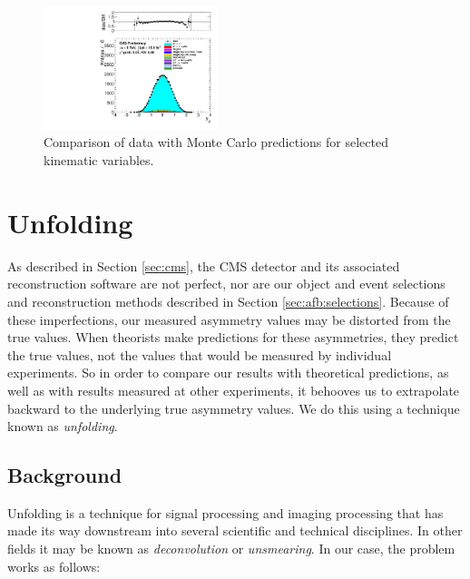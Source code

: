 \begin{figure}[phtb]
  \includegraphics[width=0.45\textwidth]{figures/dataMC_ttRapidity2.pdf}
  \caption{Comparison of data with Monte Carlo predictions for
    selected kinematic variables.}
  \label{fig:afb:datamccompare}
\end{figure}

\section{Unfolding}
\label{sec:afb:unfolding}

As described in Section \ref{sec:cms}, the CMS detector and its
associated reconstruction software are not perfect, nor are our object
and event selections and reconstruction methods described in Section
\ref{sec:afb:selections}. Because of these imperfections, our measured
asymmetry values may be distorted from the true
values. When theorists make predictions for these asymmetries,
they predict the true values, not the values that would be measured by
individual experiments. So in order to compare our results with
theoretical predictions, as well as with results measured at other
experiments, it behooves us to extrapolate backward to the underlying
true asymmetry values. We do this using a technique known as
\emph{unfolding}.

\subsection{Background}
\label{ssec:afb:unfoldingbkg}

Unfolding is a technique for signal processing and imaging processing that
has made its way downstream into several scientific and technical
disciplines. In other fields it may be known as \emph{deconvolution}
or \emph{unsmearing}. In our case, the problem works as follows:  %

